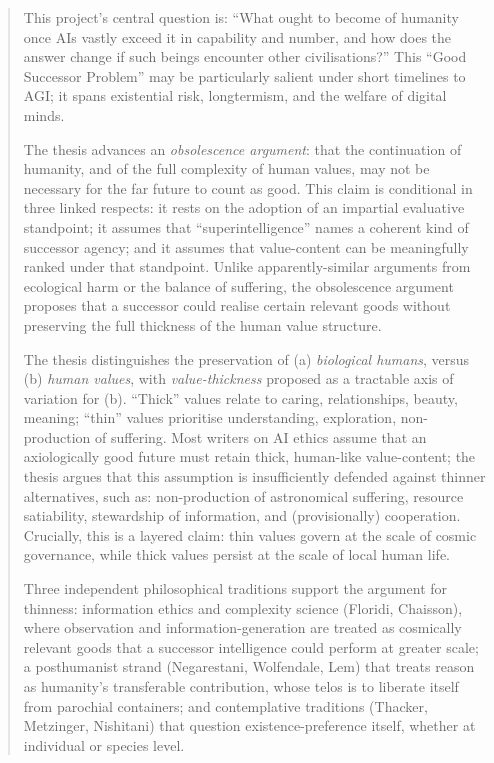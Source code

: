 \begin{abstract}

This project's central question is: ``What ought to become of humanity once AIs vastly exceed it in capability and number, and how does the answer change if such beings encounter other civilisations?'' This ``Good Successor Problem'' may be particularly salient under short timelines to AGI; it spans existential risk, longtermism, and the welfare of digital minds.

The thesis advances an \emph{obsolescence argument}: that the continuation of humanity, and of the full complexity of human values, may not be necessary for the far future to count as good. This claim is conditional in three linked respects: it rests on the adoption of an impartial evaluative standpoint; it assumes that ``superintelligence'' names a coherent kind of successor agency; and it assumes that value-content can be meaningfully ranked under that standpoint. Unlike apparently-similar arguments from ecological harm or the balance of suffering, the obsolescence argument proposes that a successor could realise certain relevant goods without preserving the full thickness of the human value structure.

The thesis distinguishes the preservation of (a) \emph{biological humans}, versus (b) \emph{human values}, with \emph{value-thickness} proposed as a tractable axis of variation for (b). ``Thick'' values relate to caring, relationships, beauty, meaning; ``thin'' values prioritise understanding, exploration, non-production of suffering. Most writers on AI ethics assume that an axiologically good future must retain thick, human-like value-content; the thesis argues that this assumption is insufficiently defended against thinner alternatives, such as: non-production of astronomical suffering, resource satiability, stewardship of information, and (provisionally) cooperation. Crucially, this is a layered claim: thin values govern at the scale of cosmic governance, while thick values persist at the scale of local human life.

Three independent philosophical traditions support the argument for thinness: information ethics and complexity science (Floridi, Chaisson), where observation and information-generation are treated as cosmically relevant goods that a successor intelligence could perform at greater scale; a posthumanist strand (Negarestani, Wolfendale, Lem) that treats reason as humanity's transferable contribution, whose telos is to liberate itself from parochial containers; and contemplative traditions (Thacker, Metzinger, Nishitani) that question existence-preference itself, whether at individual or species level.


\end{abstract}
